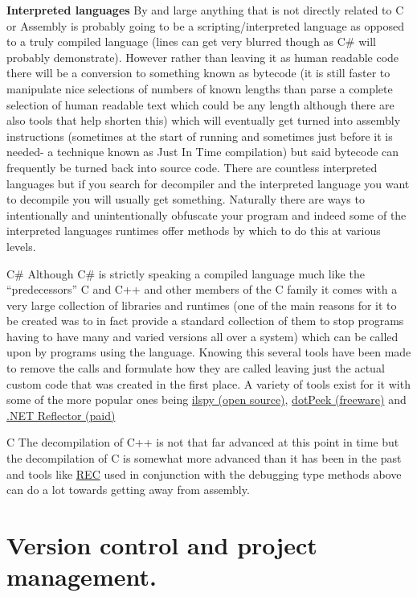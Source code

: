 \documentclass[
]{book}
\begin{document}
\textbf{Interpreted languages} By and large anything that is not directly related to C or Assembly is probably going to be a scripting/interpreted language as opposed to a truly compiled language (lines can get very blurred though as C\# will probably demonstrate). However rather than leaving it as human readable code there will be a conversion to something known as bytecode (it is still faster to manipulate nice selections of numbers of known lengths than parse a complete selection of human readable text which could be any length although there are also tools that help shorten this) which will eventually get turned into assembly instructions (sometimes at the start of running and sometimes just before it is needed- a technique known as Just In Time compilation) but said bytecode can frequently be turned back into source code. There are countless interpreted languages but if you search for decompiler and the interpreted language you want to decompile you will usually get something. Naturally there are ways to intentionally and unintentionally obfuscate your program and indeed some of the interpreted languages runtimes offer methods by which to do this at various levels.

C\# Although C\# is strictly speaking a compiled language much like the ``predecessors'' C and C++ and other members of the C family it comes with a very large collection of libraries and runtimes (one of the main reasons for it to be created was to in fact provide a standard collection of them to stop programs having to have many and varied versions all over a system) which can be called upon by programs using the language. Knowing this several tools have been made to remove the calls and formulate how they are called leaving just the actual custom code that was created in the first place. A variety of tools exist for it with some of the more popular ones being \href{http://wiki.sharpdevelop.net/ilspy.ashx}{ilspy (open source)}, \href{http://www.jetbrains.com/decompiler/}{dotPeek (freeware)} and \href{http://www.reflector.net/}{.NET Reflector (paid)}

C The decompilation of C++ is not that far advanced at this point in time but the decompilation of C is somewhat more advanced than it has been in the past and tools like \href{http://www.backerstreet.com/rec/rec.htm}{REC} used in conjunction with the debugging type methods above can do a lot towards getting away from assembly.

\hypertarget{version-control-and-project-management.}{%
\chapter{Version control and project management.}\label{version-control-and-project-management.}}
\end{document}
